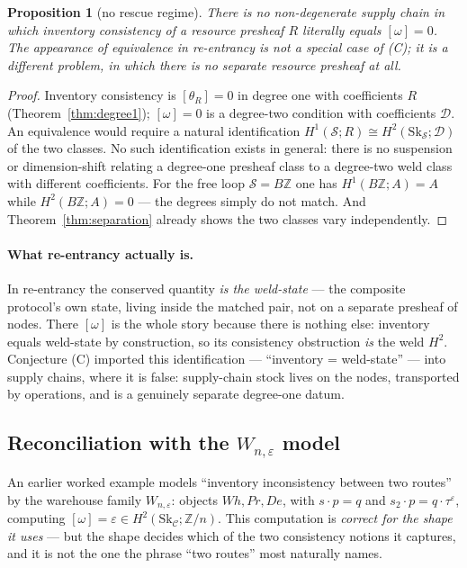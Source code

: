 \documentclass[11pt]{article}
\newtheorem{proposition}[theorem]{Proposition}
\theoremstyle{definition}
\newcommand{\Sc}{\mathcal{S}}
\newcommand{\C}{\mathcal{C}}
\newcommand{\D}{\mathcal{D}}
\newcommand{\Sk}{\mathrm{Sk}}
\newcommand{\Z}{\mathbb{Z}}
\begin{document}
\begin{proposition}[no rescue regime]\label{prop:norescue}
There is no non-degenerate supply chain in which inventory consistency of a resource presheaf
$R$ literally equals $[\omega]=0$. The appearance of equivalence in re-entrancy is not a special
case of (C); it is a different problem, in which there is no separate resource presheaf at all.
\end{proposition}

\begin{proof}
Inventory consistency is $[\theta_R]=0$ in degree one with coefficients $R$
(Theorem~\ref{thm:degree1}); $[\omega]=0$ is a degree-two condition with coefficients $\D$. An
equivalence would require a natural identification $H^1(\Sc;R)\cong H^2(\Sk_\Sc;\D)$ of the two
classes. No such identification exists in general: there is no suspension or dimension-shift
relating a degree-one presheaf class to a degree-two weld class with different coefficients. For
the free loop $\Sc=B\Z$ one has $H^1(B\Z;A)=A$ while $H^2(B\Z;A)=0$ --- the degrees simply do not
match. And Theorem~\ref{thm:separation} already shows the two classes vary independently.
\end{proof}

\paragraph{What re-entrancy actually is.} In re-entrancy the conserved quantity \emph{is the
weld-state} --- the composite protocol's own state, living inside the matched pair, not on a
separate presheaf of nodes. There $[\omega]$ is the whole story because there is nothing else:
inventory equals weld-state by construction, so its consistency obstruction \emph{is} the weld
$H^2$. Conjecture (C) imported this identification --- ``inventory = weld-state'' --- into supply
chains, where it is false: supply-chain stock lives on the nodes, transported by operations, and
is a genuinely separate degree-one datum.

\subsection*{Reconciliation with the $W_{n,\varepsilon}$ model}\label{sub:reconcile}

An earlier worked example \cite{supplyzs} models ``inventory inconsistency between two routes''
by the warehouse family $W_{n,\varepsilon}$: objects $Wh,Pr,De$, with $s\cdot p=q$ and
$s_2\cdot p=q\cdot\tau^\varepsilon$, computing $[\omega]=\varepsilon\in H^2(\Sk_\C;\Z/n)$. This
computation is \emph{correct for the shape it uses} --- but the shape decides which of the two
consistency notions it captures, and it is not the one the phrase ``two routes'' most naturally
names.
\end{document}
